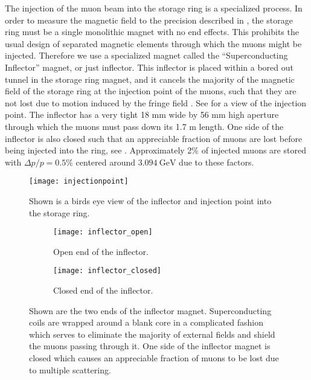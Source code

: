 The injection of the muon beam into the \gmtwo storage ring is a specialized process. In order to measure the magnetic field to the precision described in , the \gmtwo storage ring must be a single monolithic magnet with no end effects. This prohibits the usual design of separated magnetic elements through which the muons might be injected. Therefore we use a specialized magnet called the ``Superconducting Inflector'' magnet, or just inflector. This inflector is placed within a bored out tunnel in the storage ring magnet, and it cancels the majority of the magnetic field of the storage ring at the injection point of the muons, such that they are not lost due to motion induced by the fringe field \cite{inflector}. See  for a view of the injection point. The inflector has a very tight 18 mm wide by 56 mm high aperture through which the muons must pass down its 1.7 m length. One side of the inflector is also closed such that an appreciable fraction of muons are lost before being injected into the ring, see . Approximately 2\% of injected muons are stored with $\Delta p / p = 0.5\%$ centered around $\SI{3.094}{\GeV}$ due to these factors.


\begin{figure}[]
    \centering
    \texttt{[image: injectionpoint]}
    \caption[Muon injection point through inflector]{Shown is a birds eye view of the inflector and injection point into the storage ring.}   
    \label{fig:injectionpoint}
\end{figure}

\begin{figure}[]
\centering
    \begin{subfigure}[]{0.46\textwidth}
        \centering
        \texttt{[image: inflector\_open]}
        \caption{Open end of the inflector.}
    \end{subfigure}%
    \hspace{1cm}
    \begin{subfigure}[]{0.45\textwidth}
        \centering
        \texttt{[image: inflector\_closed]}
        \caption{Closed end of the inflector.}
    \end{subfigure}
\caption[Superconducting Inflector magnet]{Shown are the two ends of the inflector magnet. Superconducting coils are wrapped around a blank core in a complicated fashion which serves to eliminate the majority of external fields and shield the muons passing through it. One side of the inflector magnet is closed which causes an appreciable fraction of muons to be lost due to multiple scattering.}
\label{fig:inflector}
\end{figure}


